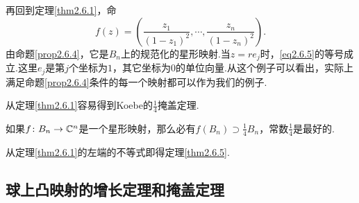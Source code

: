 再回到定理\ref{thm2.6.1}，命
\[f(z)=\left(\frac{z_1}{(1-z_1)^2},\cdots,\frac{z_n}{(1-z_n)^2}\right).\]
由命题\ref{prop2.6.4}，它是$B_n$上的规范化的星形映射.当$z=re_j$时，\eqref{eq2.6.5}的等号成立.这里$e_j$是第$j$个坐标为$1$，其它坐标为$0$的单位向量.从这个例子可以看出，实际上满足命题\ref{prop2.6.4}条件的每一个映射都可以作为我们的例子.

从定理\ref{thm2.6.1}容易得到Koebe的$\frac14$掩盖定理.
\begin{theorem}\label{thm2.6.5}
	如果$f\colon B_n\to\mathbb C^n$是一个星形映射，那么必有$f(B_n)\supset \frac14 B_n$，常数$\frac14$是最好的.
\end{theorem}
从定理\ref{thm2.6.1}的左端的不等式即得定理\ref{thm2.6.5}.
\subsection{球上凸映射的增长定理和掩盖定理}
